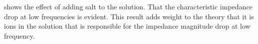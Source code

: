  shows the effect of adding salt to the solution.
That the characteristic impedance drop at low frequencies is evident.
This result adds weight to the theory that it is ions in the solution that is responsible for the impedance magnitude drop at low frequency.
